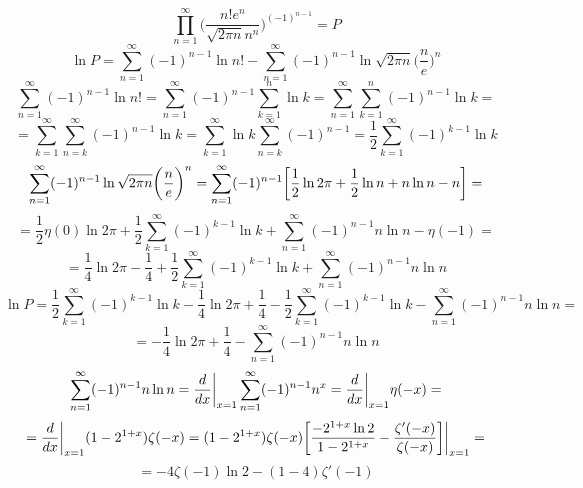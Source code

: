 


	$$\prod_{n = 1}^{\infty} \bigg(\frac{n! e^n}{\sqrt{2\pi n} n^n}\bigg)^{(-1)^{n-1}} = P$$
	$$\ln P = \sum_{n = 1}^{\infty} (-1)^{n-1} \ln n! - \sum_{n = 1}^{\infty} (-1)^{n-1} \ln \sqrt{2\pi n} \bigg(\frac{n}{e}\bigg)^n$$
	$$\sum_{n = 1}^{\infty} (-1)^{n-1} \ln n! = \sum_{n = 1}^{\infty} (-1)^{n-1} \sum_{k = 1}^{n} \ln k = \sum_{n = 1}^{\infty} \sum_{k = 1}^{n}  (-1)^{n-1} \ln k =$$
	$$= \sum_{k = 1}^{\infty} \sum_{n = k}^{\infty}  (-1)^{n-1} \ln k = \sum_{k = 1}^{\infty} \ln k \sum_{n = k}^{\infty} (-1)^{n-1} = \frac{1}{2} \sum_{k = 1}^{\infty} (-1)^{k-1} \ln k$$
	$$\sum_{n = 1}^{\infty} (-1)^{n-1} \ln \sqrt{2\pi n} \bigg(\frac{n}{e}\bigg)^n = \sum_{n = 1}^{\infty} (-1)^{n-1} \bigg{[} \frac{1}{2} \ln 2\pi +\frac{1}{2} \ln n +n\ln n - n \bigg{]}=$$
	$$= \frac{1}{2} \eta(0) \ln 2\pi  + \frac{1}{2} \sum_{k = 1}^{\infty} (-1)^{k-1} \ln k + \sum_{n = 1}^{\infty} (-1)^{n-1} n \ln n - \eta(-1)=$$
	$$= \frac{1}{4} \ln 2\pi - \frac{1}{4} +  \frac{1}{2} \sum_{k = 1}^{\infty} (-1)^{k-1} \ln k + \sum_{n = 1}^{\infty} (-1)^{n-1} n \ln n$$
	$$\ln P = \frac{1}{2} \sum_{k = 1}^{\infty} (-1)^{k-1} \ln k - \frac{1}{4} \ln 2\pi + \frac{1}{4} -  \frac{1}{2} \sum_{k = 1}^{\infty} (-1)^{k-1} \ln k - \sum_{n = 1}^{\infty} (-1)^{n-1} n \ln n =$$
	$$= - \frac{1}{4} \ln 2\pi + \frac{1}{4} - \sum_{n = 1}^{\infty} (-1)^{n-1} n \ln n$$
	$$\sum_{n = 1}^{\infty} (-1)^{n-1} n \ln n = \frac{d}{dx} \bigg{|}_{x = 1} \sum_{n = 1}^{\infty} (-1)^{n-1} n^x = \frac{d}{dx} \bigg{|}_{x = 1} \eta(-x) =$$
	$$= \frac{d}{dx} \bigg{|}_{x = 1} (1-2^{1+x})\zeta(-x) = (1-2^{1+x})\zeta(-x) \bigg{[} \frac{-2^{1+x}\ln 2}{1-2^{1+x}} - \frac{\zeta'(-x)}{\zeta(-x)} \bigg{]} \bigg{|}_{x = 1} =$$
	$$=-4\zeta(-1) \ln 2 - (1 - 4)\zeta'(-1)$$
